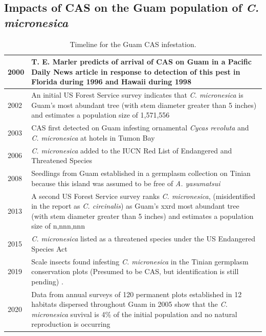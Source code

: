 \documentclass[12pt,letterpaper,english,bibliography=totocnumbered, abstract=on]{scrartcl}
\begin{document}

\subsection{Impacts of CAS on the Guam population of \textit{C. micronesica}}

\begin{table}[p]
	\centering
	\label{tab:timeline}	
	\caption{Timeline for the Guam CAS infestation.}	
	\begin{tabular}{l>{\raggedright\arraybackslash}p{4.5in}}
		\hline
		2000 & T. E. Marler predicts of arrival of CAS on Guam in a Pacific Daily News article \parencite{haynesExoticInvasivePest2005} in response to detection of this pest in Florida during 1996 \parencite{howardAulacaspisYasumatsuiHemiptera1999a} and Hawaii during 1998 \parencite{heu2003sago}
		\\\hline
		2002 & An initial US Forest Service survey indicates that \textit{C. micronesica} is Guam's most abundant tree (with stem diameter greater than 5 inches) and estimates a population size of 1,571,556 \parencite{donnegon_guams_2004}
		\\\hline
		2003 & CAS first detected on Guam infesting ornamental \textit{Cycas revoluta} and \textit{C. micronesica} at hotels in Tumon Bay
		\\\hline
		2006 & \textit{C. micronesica} added to the IUCN Red List of Endangered and Threatened Species
		\\\hline
		2008 & Seedlings from Guam established in a germplasm collection on Tinian because this island was assumed to be free of \textit{A. yasumatsui}
		\\\hline
		2013 & A second US Forest Service survey ranks \textit{C. micronesica}, (misidentified in the report as \textit{C. circinalis}) as Guam's xxrd most abundant tree (with stem diameter greater than 5 inches) and estimates a population size of n,nnn,nnn \parencite{lazaroGuamForestResources2020a}
		\\\hline
		2015 & \textit{C. micronesica} listed as a threatened species under the US Endangered Species Act \parencite{unitedstatesgovernmentEndangeredThreatenedWildlife2015}
		\\\hline
		2019 & Scale insects found infesting \textit{C. micronesica} in the Tinian germplasm conservation plots (Presumed to be CAS, but identification is still pending) \parencite{andersenairforcebaseCycadMonitoringManagement2021}.
		\\\hline
		2020 & Data from annual surveys of 120 permanent plots established in 12 habitats dispersed throughout Guam in 2005 show that the \textit{C. micronesica} suvival is 4\% of the initial population and no natural reproduction is occurring \parencite{marlerLongitudeForestFragmentation2020}
		\\\hline
	\end{tabular}	
\end{table}
\end{document}
